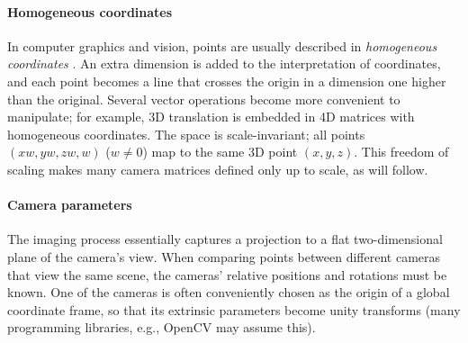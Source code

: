 

\paragraph{Homogeneous coordinates}
In computer graphics and vision, points are usually described in \emph{homogeneous coordinates} \cite{dubrofsky2009homography,hartley03multiview,heyden2005multiple}.
An extra dimension is added to the interpretation of coordinates, and each point becomes a line that crosses the origin in a dimension one higher than the original.
Several vector operations become more convenient to manipulate; for example, 3D translation is embedded in 4D matrices with homogeneous coordinates.
The space is scale-invariant; all points $(xw, yw, zw, w)$ ($w \neq 0$) map to the same 3D point $(x, y, z)$.
This freedom of scaling makes many camera matrices defined only up to scale, as will follow.


\paragraph{Camera parameters}
The imaging process essentially captures a projection to a flat two-dimensional plane of the camera's view.
When comparing points between different cameras that view the same scene, the cameras' relative positions and rotations must be known.
One of the cameras is often conveniently chosen as the origin of a global coordinate frame, so that its extrinsic parameters become unity transforms (many programming libraries, e.g., OpenCV \cite{opencv} may assume this).

